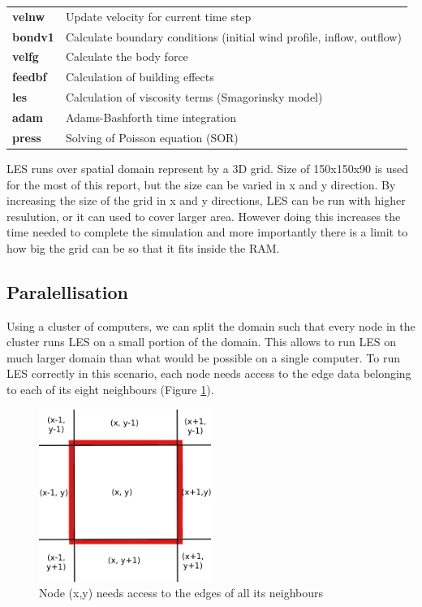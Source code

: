 \documentclass{l4proj}
\begin{document}
\begin{tabular}{ | l | l | }
  \hline	
  \textbf{velnw} & Update velocity for current time step \\
  \textbf{bondv1} & Calculate boundary conditions (initial wind profile, inflow, outflow) \\
  \textbf{velfg} & Calculate the body force \\
  \textbf{feedbf} & Calculation of building effects \\
  \textbf{les} & Calculation of viscosity terms (Smagorinsky model) \\
  \textbf{adam} & Adams-Bashforth time integration \\
  \textbf{press} & Solving of Poisson equation (SOR) \\
  \hline	
\end{tabular}

LES runs over spatial domain represent by a 3D grid. Size of 150x150x90 is used	for the most
of this report, but the size can be varied in x and y direction. By increasing the size of the
grid in x and y directions, LES can be run with higher resulution, or it can used 
to cover larger area. However doing this increases the time needed to complete the simulation
and more importantly there is a limit to how big the grid can be so that it fits inside the RAM.

\subsection{Paralellisation}

Using a cluster of computers, we can split the domain such that every node in the cluster runs
LES on a small portion of the domain. This allows to run LES on much larger domain than what would be
possible on a single computer. To run LES correctly in this scenario, each node needs access to the 
edge data belonging to each of its eight neighbours (Figure \ref{fig:neighbours}).

\begin{figure}
\centering
\includegraphics[width=0.5\textwidth]{images/neighbours.png}
\caption{Node (x,y) needs access to the edges of all its neighbours}
\label{fig:neighbours}
\end{figure}
\end{document}
